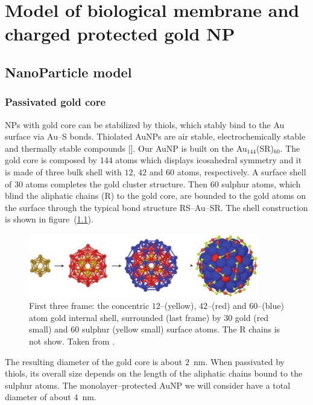 \chapter{Model of biological membrane and charged protected gold NP}

\section{NanoParticle model}


\subsection{Passivated gold core}
\acp{NP} with gold core can be stabilized by thiols, which stably bind to the Au surface via Au--S bonds. Thiolated Au\acp{NP} are air stable, electrochemically stable and thermally stable compounds []. Our Au\ac{NP} is built on the {Au$_{144}$(SR)$_{60}$}. The gold core is composed by $144$ atoms which displays icosahedral symmetry and it is made of three bulk shell with $12$, $42$ and $60$ atoms, respectively. A surface shell of $30$ atoms completes the gold cluster structure. Then $60$ sulphur atoms, which blind the aliphatic chains (R) to the gold core, are bounded to the gold atoms on the surface through the typical bond structure RS--Au--SR. The shell construction is shown in figure~(\ref{fig:goldShell}).
\begin{figure}[!ht]
	\centering
	\includegraphics[width=0.9\textwidth]{./img/goldShell}
	\caption{First three frame: the concentric $12$--(yellow), $42$--(red) and $60$--(blue) atom gold internal shell, surrounded (last frame) by $30$ gold (red small) and $60$ sulphur (yellow small) surface atoms. The R chains is not show. Taken from \cite{corePassivated}.}
	\label{fig:goldShell}
\end{figure}

The resulting diameter of the gold core is about $2$~nm. When passivated by thiols, its overall size depends on the length of the aliphatic chains bound to the sulphur atoms. The monolayer--protected Au\ac{NP} we will consider have a total diameter of about $4$~nm.


